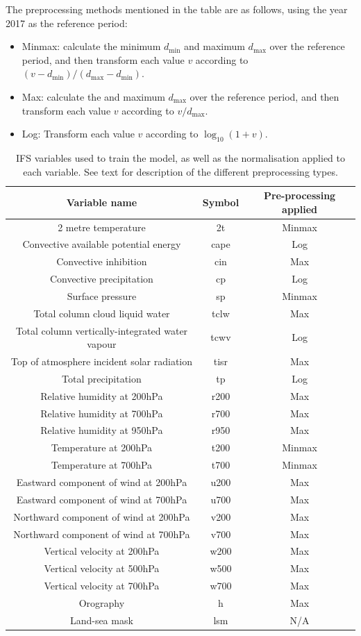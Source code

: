 \documentclass{article}
\begin{document}
The preprocessing methods mentioned in the table are as follows, using the year 2017 as the reference period:
\begin{itemize}
    \item Minmax: calculate the minimum $d_{\text{min}}$ and maximum $d_{\text{max}}$ over the reference period, and then transform each value $v$ according to $(v - d_{\text{min}}) / (d_{\text{max}} - d_{\text{min}})$.
    \item Max: calculate the and maximum $d_{\text{max}}$ over the reference period, and then transform each value $v$ according to $v  / d_{\text{max}}$.
    \item Log: Transform each value $v$ according to $\log_{10}(1+v)$.
\end{itemize}
\begin{table}[ht!]
\centering
\begin{tabular}{c | c | c } 
 \hline
 Variable name & Symbol & Pre-processing applied \\ [0.5ex] 
 \hline\hline
 2 metre temperature &2t & Minmax  \\
 Convective available potential energy &cape & Log \\
 Convective inhibition &cin & Max \\
Convective precipitation &cp & Log \\
Surface pressure & sp & Minmax  \\
Total column cloud liquid water &tclw & Max \\
Total column vertically-integrated water vapour&tcwv & Log \\
Top of atmosphere incident solar radiation&tisr & Max \\
Total precipitation &tp & Log \\
Relative humidity at 200hPa  &r200 & Max \\
Relative humidity at 700hPa  &r700 & Max \\
Relative humidity at 950hPa  &r950 & Max \\
Temperature at 200hPa &t200 & Minmax \\
Temperature at 700hPa  &t700 & Minmax \\
Eastward component of wind at 200hPa &u200 & Max \\
Eastward component of wind at 700hPa &u700 & Max \\
Northward component of wind at 200hPa&v200 & Max \\
Northward component of wind at 700hPa &v700 & Max \\
Vertical velocity at 200hPa &w200 & Max \\
Vertical velocity at 500hPa &w500 & Max \\
Vertical velocity at 700hPa &w700 & Max \\
Orography & h & Max \\
Land-sea mask & lsm & N/A \\
 \hline
\end{tabular}

\caption{IFS variables used to train the model, as well as the normalisation applied to each variable. See text for description of the different preprocessing types.}
\label{tab:vars}
\end{table}
\end{document}
